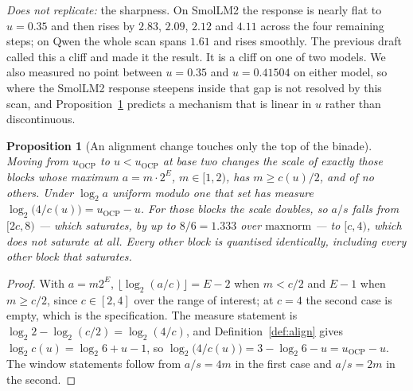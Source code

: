 \documentclass[11pt]{article}
\newtheorem{proposition}[theorem]{Proposition}
\theoremstyle{definition}
\begin{document}
\emph{Does not replicate:} the sharpness. On SmolLM2 the response is nearly flat
to $u=0.35$ and then rises by $2.83$, $2.09$, $2.12$ and $4.11$ across the four
remaining steps; on Qwen the whole scan spans $1.61$ and rises smoothly. The
previous draft called this a cliff and made it the result. It is a cliff on one
of two models. We also measured no point between $u=0.35$ and $u=0.41504$ on
either model, so where the SmolLM2 response steepens inside that gap is not
resolved by this scan, and Proposition~\ref{prop:touched} predicts a mechanism
that is linear in $u$ rather than discontinuous.

\begin{proposition}[An alignment change touches only the top of the binade]
\label{prop:touched}
Moving from $u_{\mathrm{OCP}}$ to $u<u_{\mathrm{OCP}}$ at base two changes the
scale of exactly those blocks whose maximum $a=m\cdot2^{E}$, $m\in[1,2)$, has
$m \ge c(u)/2$, and of no others. Under $\log_2 a$ uniform modulo one that set
has measure $\log_2\bigl(4/c(u)\bigr) = u_{\mathrm{OCP}}-u$. For those blocks
the scale doubles, so $a/s$ falls from $[2c,8)$ --- which saturates, by up to
$8/6=1.333$ over $\mathrm{maxnorm}$ --- to $[c,4)$, which does not saturate at
all. Every other block is quantised identically, including every other block
that saturates.
\end{proposition}

\begin{proof}
With $a=m2^{E}$, $\lfloor\log_2(a/c)\rfloor = E-2$ when $m<c/2$ and $E-1$ when
$m\ge c/2$, since $c\in[2,4]$ over the range of interest; at $c=4$ the second
case is empty, which is the specification. The measure statement is
$\log_2 2-\log_2(c/2)=\log_2(4/c)$, and Definition~\ref{def:align} gives
$\log_2 c(u) = \log_2 6 + u - 1$, so
$\log_2\bigl(4/c(u)\bigr) = 3-\log_2 6-u = u_{\mathrm{OCP}}-u$. The window
statements follow from $a/s=4m$ in the first case and $a/s=2m$ in the second.
\end{proof}
\end{document}
